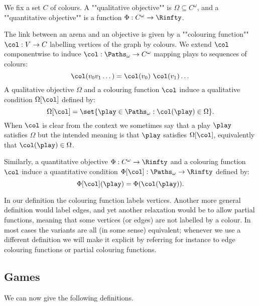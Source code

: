 We fix a set $C$ of colours. 
A ""qualitative objective"" is $\Omega \subseteq C^\omega$, and a ""quantitative objective"" is a function $\Phi : C^\omega \to \Rinfty$. 

The link between an arena and an objective is given by a ""colouring function"" $\col : V \to C$ labelling vertices of the graph by colours.
We extend $\col$ componentwise to induce $\col : \Paths_\omega \to C^\omega$ mapping plays to sequences of colours:
\[
\col(v_0 v_1 \dots) = \col(v_0)\ \col(v_1) \dots
\]
A qualitative objective $\Omega$ and a colouring function $\col$ induce a qualitative condition $\Omega[\col]$ defined by:
\[
\Omega[\col] = \set{\play \in \Paths_\omega : \col(\play) \in \Omega}.
\] 
When $\col$ is clear from the context we sometimes say that a play $\play$ satisfies $\Omega$ but the intended meaning is that 
$\play$ satisfies $\Omega[\col]$, equivalently that $\col(\play) \in \Omega$.

Similarly, a quantitative objective $\Phi : C^\omega \to \Rinfty$ and a colouring function $\col$ induce 
a quantitative condition $\Phi[\col] : \Paths_\omega \to \Rinfty$ defined by:
\[
\Phi[\col](\play) = \Phi(\col(\play)).
\]

\begin{remark}
In our definition the colouring function labels vertices.
Another more general definition would label edges, and yet another relaxation would be to allow partial functions,
meaning that some vertices (or edges) are not labelled by a colour.
In most cases the variants are all (in some sense) equivalent; 
whenever we use a different definition we will make it explicit by referring for instance to edge colouring functions
or partial colouring functions.
\end{remark}

\subsection*{Games}
We can now give the following definitions.

